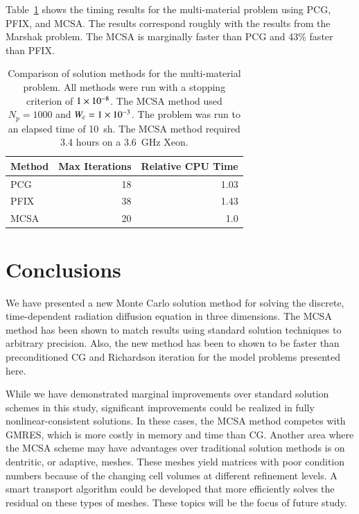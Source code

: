 \documentclass[preprint,12pt]{elsarticle}
\begin{document}
Table~\ref{tab:multimat_comparison} shows the timing results for the
multi-material problem using PCG, PFIX, and MCSA.  The results
correspond roughly with the results from the Marshak problem.  The
MCSA is marginally faster than PCG and 43\% faster than PFIX.

\begin{table}[htbp!]
  \begin{center}
    \begin{tabular}{lrr}\hline\hline
      \multicolumn{1}{c}{Method} & \multicolumn{1}{c}{Max Iterations}
      & \multicolumn{1}{c}{Relative CPU Time}\\\hline\hline  PCG &
      18 & 1.03 \\  PFIX & 38 & 1.43 \\  MCSA & 20 & 1.0
      \\ \hline\hline
    \end{tabular}
  \end{center}
  \caption{ Comparison of solution methods for the multi-material
    problem. All methods were run with a stopping criterion of
    $1\times 10^{-8}$.  The MCSA method used $N_p=1000$ and $W_c =
    1\times 10^{-3}$.  The problem was run to an elapsed time of 10~sh.
    The MCSA method required 3.4 hours on a 3.6~GHz Xeon.}
  \label{tab:multimat_comparison}
\end{table}

\section{Conclusions}
\label{sec:conclusions}

We have presented a new Monte Carlo solution method for solving the
discrete, time-dependent radiation diffusion equation in three
dimensions.  The MCSA method has been shown to match results using
standard solution techniques to arbitrary precision. Also, the new
method has been to shown to be faster than preconditioned CG and
Richardson iteration for the model problems presented here.

While we have demonstrated marginal improvements over standard
solution schemes in this study, significant improvements could be
realized in fully nonlinear-consistent solutions.  In these cases, the
MCSA method competes with GMRES, which is more costly in memory and
time than CG.  Another area where the MCSA scheme may have advantages
over traditional solution methods is on dentritic, or adaptive,
meshes.  These meshes yield matrices with poor condition numbers
because of the changing cell volumes at different refinement levels.
A smart transport algorithm could be developed that more efficiently
solves the residual on these types of meshes.  These topics will be
the focus of future study.
\end{document}
